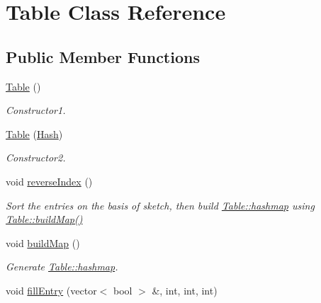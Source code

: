\hypertarget{classTable}{\section{\-Table \-Class \-Reference}
\label{classTable}
}
\subsection*{\-Public \-Member \-Functions}
\begin{DoxyCompactItemize}
\item 
\hypertarget{classTable_a049f2e06391781ae255c6698869c4ad1}{\hyperlink{classTable_a049f2e06391781ae255c6698869c4ad1}{\-Table} ()}\label{classTable_a049f2e06391781ae255c6698869c4ad1}

\begin{DoxyCompactList}\small\item\em \-Constructor1. \end{DoxyCompactList}\item 
\hypertarget{classTable_afa7224dc42a93bcf6928183aabf47085}{\hyperlink{classTable_afa7224dc42a93bcf6928183aabf47085}{\-Table} (\hyperlink{classHash}{\-Hash})}\label{classTable_afa7224dc42a93bcf6928183aabf47085}

\begin{DoxyCompactList}\small\item\em \-Constructor2. \end{DoxyCompactList}\item 
\hypertarget{classTable_a1394e64084209ac7c89028aa4a268efa}{void \hyperlink{classTable_a1394e64084209ac7c89028aa4a268efa}{reverse\-Index} ()}\label{classTable_a1394e64084209ac7c89028aa4a268efa}

\begin{DoxyCompactList}\small\item\em \-Sort the entries on the basis of sketch, then build \hyperlink{classTable_a1b577c35b4a5e34d49b64041f1ca9643}{\-Table\-::hashmap} using \hyperlink{classTable_ad96aac7308901debb1cd6bcb083c1864}{\-Table\-::build\-Map()} \end{DoxyCompactList}\item 
void \hyperlink{classTable_ad96aac7308901debb1cd6bcb083c1864}{build\-Map} ()
\begin{DoxyCompactList}\small\item\em \-Generate \hyperlink{classTable_a1b577c35b4a5e34d49b64041f1ca9643}{\-Table\-::hashmap}. \end{DoxyCompactList}\item 
\hypertarget{classTable_a313d283fdadd46e30933e300562fe1f8}{void \hyperlink{classTable_a313d283fdadd46e30933e300562fe1f8}{fill\-Entry} (vector$<$ bool $>$ \&, int, int, int)}\label{classTable_a313d283fdadd46e30933e300562fe1f8}


\end{DoxyCompactItemize}
